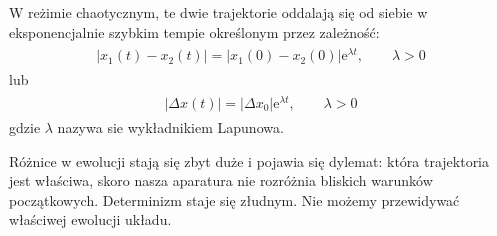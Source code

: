 \documentclass[a4paper,12pt,polish]{sphinxmanual}
\begin{document}
W reżimie chaotycznym, te dwie trajektorie oddalają się od siebie w eksponencjalnie szybkim tempie określonym przez zależność:
\label{ch2/chII011:equation-eqn22}\begin{gather}
\begin{split}|x_1(t) - x_2(t)| = |x_1(0) - x_2(0)|\mbox{e}^{\lambda t}, \qquad \lambda > 0\end{split}\label{ch2/chII011-eqn22}
\end{gather}
lub
\label{ch2/chII011:equation-eqn23}\begin{gather}
\begin{split}|\Delta x(t)| = |\Delta x_0|\mbox{e}^{\lambda t}, \qquad \lambda > 0\end{split}\label{ch2/chII011-eqn23}
\end{gather}
gdzie $\lambda$ nazywa sie wykładnikiem Lapunowa.

Różnice w ewolucji stają się zbyt duże i pojawia się dylemat: która trajektoria jest właściwa, skoro nasza aparatura nie rozróżnia bliskich warunków początkowych. Determinizm staje się złudnym. Nie możemy przewidywać właściwej ewolucji układu.
\end{document}
